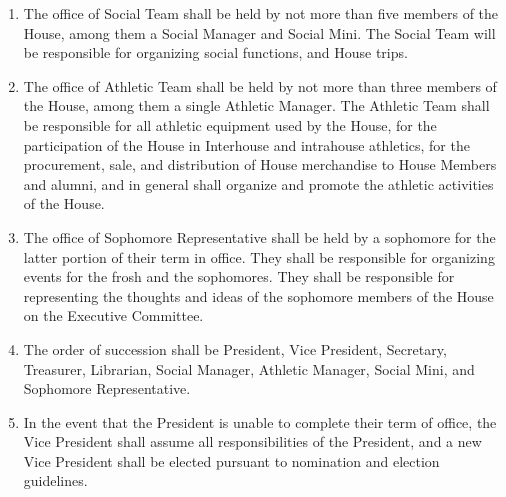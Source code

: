 \documentclass[10pt]{article} %
\begin{document}
\begin{enumerate}
\item The office of Social Team shall be held by not more than five members of the House, among them a Social Manager and Social Mini. The Social Team will be responsible for organizing social functions, and House trips.
\item The office of Athletic Team shall be held by not more than three members of the House, among them a single Athletic Manager. The Athletic Team shall be responsible for all athletic equipment used by the House, for the participation of the House in Interhouse and intrahouse athletics, for the procurement, sale, and distribution of House merchandise to House Members and alumni, and in general shall organize and promote the athletic activities of the House.
\item The office of Sophomore Representative shall be held by a sophomore for the latter portion of their term in office. They shall be responsible for organizing events for the frosh and the sophomores. They shall be responsible for representing the thoughts and ideas of the sophomore members of the House on the Executive Committee.
\item The order of succession shall be President, Vice President, Secretary, Treasurer, Librarian, Social Manager, Athletic Manager, Social Mini, and Sophomore Representative.
\item \label{PrezSuccession} In the event that the President is unable to complete their term of office, the Vice President shall assume all responsibilities of the President, and a new Vice President shall be elected pursuant to nomination and election guidelines.
\end{enumerate}
\end{document}
